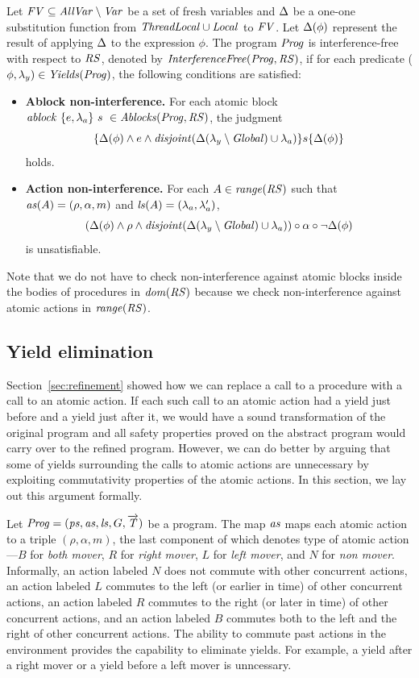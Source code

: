 Let $\mathit{FV} \subseteq \mathit{AllVar} \setminus \mathit{Var}$ be a set of fresh variables and $\Delta$ be a one-one 
substitution function from $\mathit{ThreadLocal} \cup \mathit{Local}$ to $\mathit{FV}$.
Let $\Delta(\phi)$ represent the result of applying $\Delta$ to the expression $\phi$.
The program $\mathit{Prog}$ is interference-free with respect to $\mathit{RS}$, denoted by $\mathit{InterferenceFree}(\mathit{Prog},\mathit{RS})$,
if for each predicate ($\phi,\lambda_y) \in \mathit{Yields}(\mathit{Prog})$, the following conditions are satisfied:
\begin{itemize}
\item {\bf Ablock non-interference.}
For each atomic block $\mathit{ablock}\ {\{e,\lambda_a\}}\ {s}\  \in \mathit{Ablocks}(\mathit{Prog},\mathit{RS})$, the judgment
\[
\{\Delta(\phi) \wedge e \wedge \mathit{disjoint}(\Delta(\lambda_y \setminus \mathit{Global}) \cup \lambda_a)\} s \{\Delta(\phi)\}
\]
holds.
\item {\bf Action non-interference.}
For each $A \in \mathit{range}(\mathit{RS})$ such that $\mathit{as}(A) = (\rho, \alpha, m)$ and $\mathit{ls}(A) = (\lambda_a,\lambda'_a)$, 
\[
(\Delta(\phi) \wedge \rho \wedge \mathit{disjoint}(\Delta(\lambda_y \setminus \mathit{Global}) \cup \lambda_a)) \circ \alpha \circ \neg\Delta(\phi)
\]
is unsatisfiable.
\end{itemize}
Note that we do not have to check non-interference against atomic blocks inside the bodies of procedures in $\mathit{dom}(\mathit{RS})$
because we check non-interference against atomic actions in $\mathit{range}(\mathit{RS})$.

\subsection{Yield elimination}
\label{sec:yield-elimination}

Section~\ref{sec:refinement} showed how we can replace a call to a procedure with 
a call to an atomic action.
If each such call to an atomic action had a yield just before and a yield just after it,
we would have a sound transformation of the original program and all safety properties proved
on the abstract program would carry over to the refined program.
However, we can do better by arguing that some of yields surrounding the calls to atomic actions 
are unnecessary by exploiting commutativity properties of the atomic actions.
In this section, we lay out this argument formally.

Let $\mathit{Prog} = (\mathit{ps}, \mathit{as}, \mathit{ls}, G, \overrightarrow{\mathit{T}})$ be a program.
The map $\mathit{as}$ maps each atomic action to a triple $(\rho, \alpha, m)$, the last component of which 
denotes type of atomic action---$B$ for {\em both mover}, $R$ for {\em right mover}, $L$ for {\em left mover},
and $N$ for {\em non mover}.
Informally, an action labeled $N$ does not commute with other concurrent actions,
an action labeled $L$ commutes to the left (or earlier in time) of other concurrent actions,
an action labeled $R$ commutes to the right (or later in time) of other concurrent actions,
and an action labeled $B$ commutes both to the left and the right of other concurrent actions.
The ability to commute past actions in the environment provides the capability to eliminate yields.
For example, a yield after a right mover or a yield before a left mover is unncessary.


